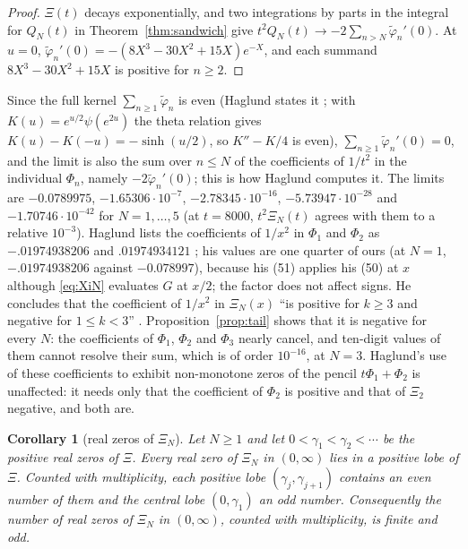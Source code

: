 \documentclass[11pt]{article}
\theoremstyle{plain}
\newtheorem{corollary}[theorem]{Corollary}
\theoremstyle{definition}
\theoremstyle{remark}
\newcommand{\tphi}{\widetilde{\varphi}}
\begin{document}
\begin{proof}
$\Xi(t)$ decays exponentially, and two integrations by parts in the integral
for $Q_N(t)$ in Theorem~\ref{thm:sandwich} give
$t^2 Q_N(t) \to -2\sum_{n > N}\tphi_n'(0)$. At $u = 0$,
$\tphi_n'(0) = -(8X^3 - 30X^2 + 15X)e^{-X}$, and each summand
$8X^3 - 30X^2 + 15X$ is positive for $n \ge 2$.
\end{proof}

Since the full kernel $\sum_{n \ge 1}\tphi_n$ is even (Haglund states it
\cite[p.~2]{Hag}; with $K(u) = e^{u/2}\psi(e^{2u})$ the theta relation gives
$K(u) - K(-u) = -\sinh(u/2)$, so $K'' - K/4$ is even),
$\sum_{n\ge1}\tphi_n'(0) = 0$, and the limit is also the sum over $n \le N$ of
the coefficients of $1/t^2$ in the individual $\Phi_n$, namely
$-2\tphi_n'(0)$; this is how Haglund computes it. The limits are $-0.0789975$,
$-1.65306\cdot10^{-7}$, $-2.78345\cdot10^{-16}$, $-5.73947\cdot10^{-28}$ and
$-1.70746\cdot10^{-42}$ for $N = 1, \ldots, 5$ (at $t = 8000$, $t^2\Xi_N(t)$ agrees with
them to a relative $10^{-3}$). Haglund lists the coefficients of
$1/x^2$ in $\Phi_1$ and $\Phi_2$ as $-.01974938206$ and $.01974934121$
\cite[(52), p.~10]{Hag}; his values are one quarter of ours (at $N = 1$,
$-.01974938206$ against $-0.078997$), because his (51) applies his (50) at $x$ although
\eqref{eq:XiN} evaluates $G$ at $x/2$; the factor does not affect signs. He concludes that
the coefficient of $1/x^2$ in $\Xi_N(x)$ ``is
positive for $k \ge 3$ and negative for $1 \le k < 3$'' \cite[p.~10]{Hag}.
Proposition~\ref{prop:tail} shows that it is negative for every $N$: the
coefficients of $\Phi_1$, $\Phi_2$ and $\Phi_3$ nearly cancel, and ten-digit
values of them cannot resolve their sum, which is of order $10^{-16}$, at
$N = 3$. Haglund's use of these coefficients to exhibit non-monotone zeros of
the pencil $t\Phi_1 + \Phi_2$ is unaffected: it needs only that the coefficient
of $\Phi_2$ is positive and that of $\Xi_2$ negative, and both are.

\begin{corollary}[real zeros of $\Xi_N$]\label{cor:odd}
Let $N \ge 1$ and let $0 < \gamma_1 < \gamma_2 < \cdots$ be the positive real zeros of
$\Xi$. Every real zero of $\Xi_N$ in $(0, \infty)$ lies in a positive lobe of
$\Xi$. Counted with multiplicity, each positive lobe $(\gamma_j, \gamma_{j+1})$
contains an even number of them and the central lobe $(0, \gamma_1)$ an odd
number. Consequently the number of real zeros of $\Xi_N$ in $(0, \infty)$,
counted with multiplicity, is finite and odd.
\end{corollary}
\end{document}
